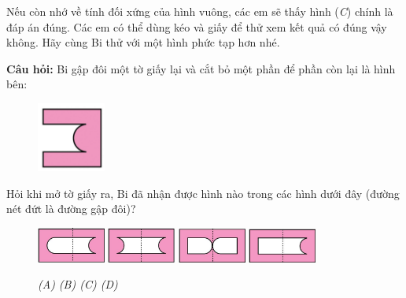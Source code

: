 Nếu còn nhớ về  tính đối xứng của hình vuông, các em sẽ thấy hình (\textit{C}) chính là đáp án đúng. Các em có thể dùng kéo và giấy để thử xem kết quả có đúng vậy không. Hãy cùng Bi thử với một hình phức tạp hơn nhé.
\vskip 0.1cm
\begin{multicols}{2}
	\textbf{Câu hỏi:} Bi gập đôi một tờ giấy lại và cắt bỏ một phần để phần còn lại là hình bên:
	
	\columnbreak
	\begin{figure}[H]
		\centering
		\captionsetup{labelformat=empty}
		\vspace*{-5pt}
		\captionsetup{justification=centering}
		\includegraphics[width =0.2\textwidth]{cat-3}
		\vspace*{-10pt}
	\end{figure}
\end{multicols}
Hỏi khi mở tờ giấy ra, Bi đã nhận được hình nào trong các hình dưới đây (đường nét đứt là đường gập đôi)?
\begin{figure}[H]
	\centering
	\captionsetup{labelformat=empty}
	\vspace*{-5pt}
	\captionsetup{justification=centering}
	\includegraphics[width =0.2\textwidth]{cat-3a.jpeg}\quad
	\includegraphics[width =0.2\textwidth]{cat-3b.jpeg}\quad
	\includegraphics[width =0.2\textwidth]{cat-3c.jpeg}\quad
	\includegraphics[width =0.2\textwidth]{cat-3d.jpeg}
	\caption{\small\textit{(A) \hspace*{55pt} (B) \hspace*{55pt}(C) \hspace*{55pt} (D)}}
	\vspace*{-10pt}
\end{figure}
